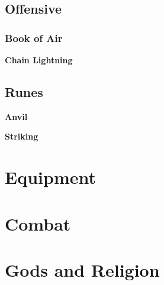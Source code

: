 \documentclass[12pt]{article}
\newcommand{\subsubsubsection}[1]{%
  \vspace{1em} %
  \noindent\textbf{\small #1}\par
  \vspace{0.5em} %
}
\begin{document}
\subsection{Offensive}
\subsubsection{Book of Air}
\subsubsubsection{Chain Lightning}
\subsection{Runes}
\subsubsubsection{Anvil}
\subsubsubsection{Striking}
\section{Equipment}
\section{Combat}
\section{Gods and Religion}











\newpage
\printindex
\end{document}
